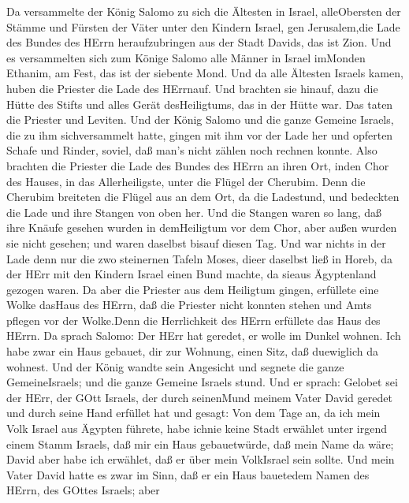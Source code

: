  Da versammelte der König Salomo zu sich die Ältesten in
Israel, alleObersten der Stämme und Fürsten der Väter unter den Kindern
Israel, gen Jerusalem,die Lade des Bundes des HErrn heraufzubringen aus
der Stadt Davids, das ist Zion.  Und es versammelten sich
zum Könige Salomo alle Männer in Israel imMonden Ethanim, am Fest, das
ist der siebente Mond.  Und da alle Ältesten Israels kamen,
huben die Priester die Lade des HErrnauf.  Und brachten sie
hinauf, dazu die Hütte des Stifts und alles Gerät desHeiligtums, das in
der Hütte war. Das taten die Priester und Leviten.  Und der
König Salomo und die ganze Gemeine Israels, die zu ihm sichversammelt
hatte, gingen mit ihm vor der Lade her und opferten Schafe und Rinder,
soviel, daß man's nicht zählen noch rechnen konnte.  Also
brachten die Priester die Lade des Bundes des HErrn an ihren Ort, inden
Chor des Hauses, in das Allerheiligste, unter die Flügel der Cherubim.
 Denn die Cherubim breiteten die Flügel aus an dem Ort, da
die Ladestund, und bedeckten die Lade und ihre Stangen von oben her.
 Und die Stangen waren so lang, daß ihre Knäufe gesehen
wurden in demHeiligtum vor dem Chor, aber außen wurden sie nicht
gesehen; und waren daselbst bisauf diesen Tag.  Und war
nichts in der Lade denn nur die zwo steinernen Tafeln Moses, dieer
daselbst ließ in Horeb, da der HErr mit den Kindern Israel einen Bund
machte, da sieaus Ägyptenland gezogen waren.  Da aber die
Priester aus dem Heiligtum gingen, erfüllete eine Wolke dasHaus des
HErrn,  daß die Priester nicht konnten stehen und Amts
pflegen vor der Wolke.Denn die Herrlichkeit des HErrn erfüllete das Haus
des HErrn.  Da sprach Salomo: Der HErr hat geredet, er
wolle im Dunkel wohnen.  Ich habe zwar ein Haus gebauet,
dir zur Wohnung, einen Sitz, daß duewiglich da wohnest. 
Und der König wandte sein Angesicht und segnete die ganze
GemeineIsraels; und die ganze Gemeine Israels stund.  Und
er sprach: Gelobet sei der HErr, der GOtt Israels, der durch seinenMund
meinem Vater David geredet und durch seine Hand erfüllet hat und gesagt:
 Von dem Tage an, da ich mein Volk Israel aus Ägypten
führete, habe ichnie keine Stadt erwählet unter irgend einem Stamm
Israels, daß mir ein Haus gebauetwürde, daß mein Name da wäre; David
aber habe ich erwählet, daß er über mein VolkIsrael sein sollte.
 Und mein Vater David hatte es zwar im Sinn, daß er ein
Haus bauetedem Namen des HErrn, des GOttes Israels;  aber
